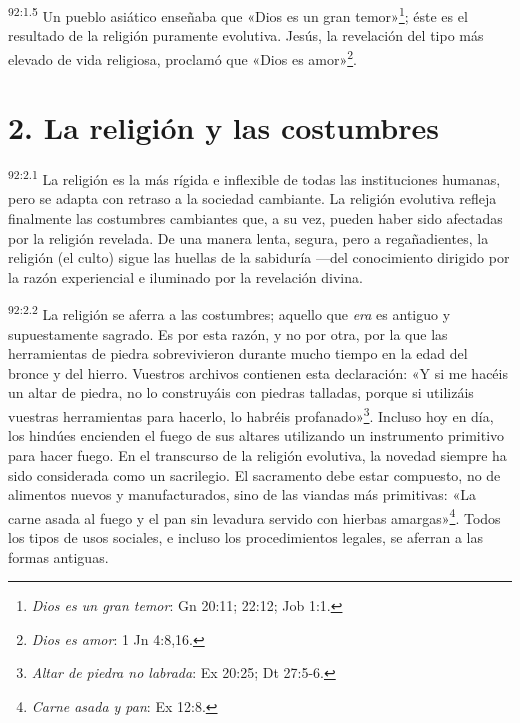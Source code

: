 \par
\textsuperscript{92:1.5} Un pueblo asiático enseñaba que «Dios es un gran temor»\footnote{\textit{Dios es un gran temor}: Gn 20:11; 22:12; Job 1:1.}; éste es el resultado de la religión puramente evolutiva. Jesús, la revelación del tipo más elevado de vida religiosa, proclamó que «Dios es amor»\footnote{\textit{Dios es amor}: 1 Jn 4:8,16.}.

\section*{2. La religión y las costumbres}
\par
\textsuperscript{92:2.1} La religión es la más rígida e inflexible de todas las instituciones humanas, pero se adapta con retraso a la sociedad cambiante. La religión evolutiva refleja finalmente las costumbres cambiantes que, a su vez, pueden haber sido afectadas por la religión revelada. De una manera lenta, segura, pero a regañadientes, la religión (el culto) sigue las huellas de la sabiduría ---del conocimiento dirigido por la razón experiencial e iluminado por la revelación divina.

\par
\textsuperscript{92:2.2} La religión se aferra a las costumbres; aquello que \textit{era} es antiguo y supuestamente sagrado. Es por esta razón, y no por otra, por la que las herramientas de piedra sobrevivieron durante mucho tiempo en la edad del bronce y del hierro. Vuestros archivos contienen esta declaración: «Y si me hacéis un altar de piedra, no lo construyáis con piedras talladas, porque si utilizáis vuestras herramientas para hacerlo, lo habréis profanado»\footnote{\textit{Altar de piedra no labrada}: Ex 20:25; Dt 27:5-6.}. Incluso hoy en día, los hindúes encienden el fuego de sus altares utilizando un instrumento primitivo para hacer fuego. En el transcurso de la religión evolutiva, la novedad siempre ha sido considerada como un sacrilegio. El sacramento debe estar compuesto, no de alimentos nuevos y manufacturados, sino de las viandas más primitivas: «La carne asada al fuego y el pan sin levadura servido con hierbas amargas»\footnote{\textit{Carne asada y pan}: Ex 12:8.}. Todos los tipos de usos sociales, e incluso los procedimientos legales, se aferran a las formas antiguas.

